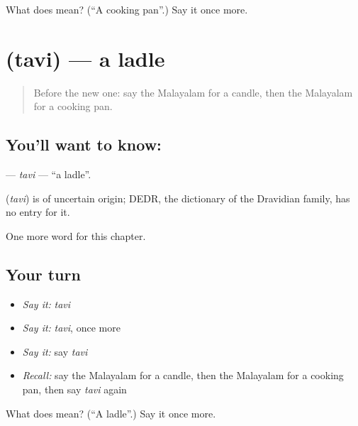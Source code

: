 \begin{tcolorbox}[breakable,colback=teal!4,colframe=teal!35!black,title={Before you move on}]
What does  mean? (\textquotedblleft{}A cooking pan\textquotedblright{}.) Say it once more.
\end{tcolorbox}
\section[\texorpdfstring{\ml{തവി} (tavi)}{തവി (tavi)}]{ (tavi) — a ladle}

\label{lesson:ML-C207-tavi}



\begin{quote}
Before the new one: say the Malayalam for a candle, then the Malayalam for a cooking pan.
\end{quote}

\subsection*{You'll want to know: }
\textbf{} — \emph{tavi} — \textquotedblleft{}a ladle\textquotedblright{}.

\begin{cousinweb}
\textbf{} (\emph{tavi}) is of uncertain origin; DEDR, the dictionary of the Dravidian family, has no entry for it.
\end{cousinweb}

\begin{grammarlens}[title={What you've built}]
One more word for this chapter.
\end{grammarlens}

\subsection*{Your turn}
\begin{itemize}
\raggedright
  \item \emph{Say it:} \emph{tavi}
  \item \emph{Say it:} \emph{tavi}, once more
  \item \emph{Say it:} say \emph{tavi}
  \item \emph{Recall:} say the Malayalam for a candle, then the Malayalam for a cooking pan, then say \emph{tavi} again
\end{itemize}

\begin{tcolorbox}[breakable,colback=teal!4,colframe=teal!35!black,title={Before you move on}]
What does  mean? (\textquotedblleft{}A ladle\textquotedblright{}.) Say it once more.
\end{tcolorbox}
